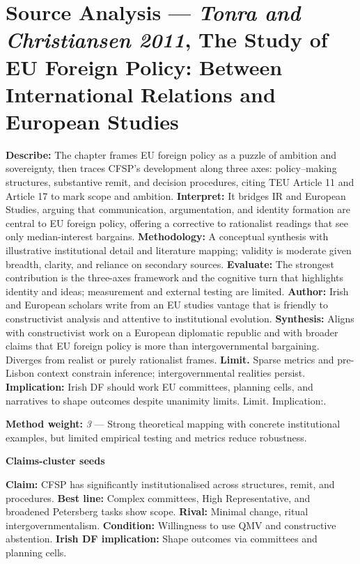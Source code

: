 \section*{Source Analysis — \textit{Tonra and Christiansen 2011}, The Study of EU Foreign Policy: Between International Relations and European Studies}
\textbf{Describe:} The chapter frames EU foreign policy as a puzzle of ambition and sovereignty, then traces CFSP’s development along three axes: policy–making structures, substantive remit, and decision procedures, citing TEU Article 11 and Article 17 to mark scope and ambition.
\textbf{Interpret:} It bridges IR and European Studies, arguing that communication, argumentation, and identity formation are central to EU foreign policy, offering a corrective to rationalist readings that see only median-interest bargains.
\textbf{Methodology:} A conceptual synthesis with illustrative institutional detail and literature mapping; validity is moderate given breadth, clarity, and reliance on secondary sources.
\textbf{Evaluate:} The strongest contribution is the three-axes framework and the cognitive turn that highlights identity and ideas; measurement and external testing are limited.
\textbf{Author:} Irish and European scholars write from an EU studies vantage that is friendly to constructivist analysis and attentive to institutional evolution.
\textbf{Synthesis:} Aligns with constructivist work on a European diplomatic republic and with broader claims that EU foreign policy is more than intergovernmental bargaining. Diverges from realist or purely rationalist frames.
\textbf{Limit.} Sparse metrics and pre-Lisbon context constrain inference; intergovernmental realities persist.
\textbf{Implication:} Irish DF should work EU committees, planning cells, and narratives to shape outcomes despite unanimity limits. Limit. Implication:.

\textbf{Method weight:} \textit{3} — Strong theoretical mapping with concrete institutional examples, but limited empirical testing and metrics reduce robustness.

\textbf{Claims-cluster seeds}

\textbf{Claim:} CFSP has significantly institutionalised across structures, remit, and procedures. \textbf{Best line:} Complex committees, High Representative, and broadened Petersberg tasks show scope. \textbf{Rival:} Minimal change, ritual intergovernmentalism. \textbf{Condition:} Willingness to use QMV and constructive abstention. \textbf{Irish DF implication:} Shape outcomes via committees and planning cells.

